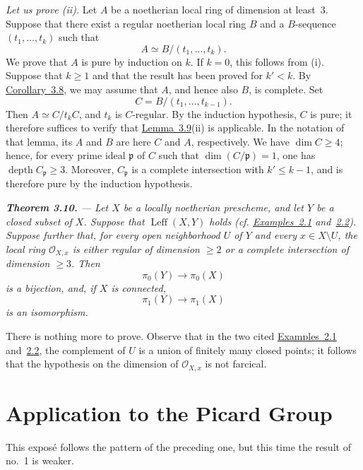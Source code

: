 \documentclass[11pt,a4paper,oneside]{book}
\providecommand{\depthop}{\operatorname{depth}}
\providecommand{\Leff}{\operatorname{Leff}}
\theoremstyle{plain}
\theoremstyle{definition}
\theoremstyle{remark}
\begin{document}
\medskip
\textit{Let us prove \textup{(ii)}.}
Let $A$ be a noetherian local ring of dimension at least~$3$. Suppose that
there exist a regular noetherian local ring $B$ and a $B$-sequence
$(t_1,\ldots,t_k)$ such that
\[
  A\simeq B/(t_1,\ldots,t_k).
\]
We prove that $A$ is pure by induction on $k$. If $k=0$, this follows from
\textup{(i)}. Suppose that $k\geq1$ and that the result has been proved for
$k'<k$. By \hyperref[X.3.8]{Corollary~3.8}, we may assume that $A$, and hence also $B$, is
complete. Set
\[
  C=B/(t_1,\ldots,t_{k-1}).
\]
Then $A\simeq C/t_kC$, and $t_k$ is $C$-regular. By the induction hypothesis,
$C$ is pure; it therefore suffices to verify that \hyperref[X.3.9]{Lemma~3.9}\textup{(ii)} is
applicable. In the notation of that lemma, its $A$ and $B$ are here $C$ and
$A$, respectively. We have $\dim C\geq4$; hence, for every prime ideal
$\mathfrak p$ of $C$ such that $\dim(C/\mathfrak p)=1$, one has
$\depthop C_{\mathfrak p}\geq3$. Moreover, $C_{\mathfrak p}$ is a complete
intersection with $k'\leq k-1$, and is therefore pure by the induction
hypothesis.

\medskip
{\itshape
{}\noindent\textbf{Theorem 3.10.} --- Let $X$ be a locally noetherian
prescheme, and let $Y$ be a closed subset of $X$. Suppose that
$\Leff(X,Y)$ holds (cf. \hyperref[X.2.1]{Examples~2.1} and~\hyperref[X.2.2]{2.2}). Suppose further that, for
every open neighborhood $U$ of $Y$ and every $x\in X\setminus U$, the
local ring $\mathcal O_{X,x}$ is either regular of dimension $\geq 2$ or
a complete intersection of dimension $\geq 3$. Then
\[
  \pi_0(Y)\longrightarrow\pi_0(X)
\]
is a bijection, and, if $X$ is connected,
\[
  \pi_1(Y)\longrightarrow\pi_1(X)
\]
is an isomorphism.
}

\medskip

There is nothing more to prove. Observe that in the two cited
\hyperref[X.2.1]{Examples~2.1} and~\hyperref[X.2.2]{2.2}, the complement of $U$ is a union of finitely many
closed points; it follows that the hypothesis on the dimension of
$\mathcal O_{X,x}$ is not farcical.


\chapter{Application to the Picard Group}\label{XI}
\medskip
This expos\'e follows the pattern of the preceding one, but this time the result of no.~1 is weaker.
\end{document}
